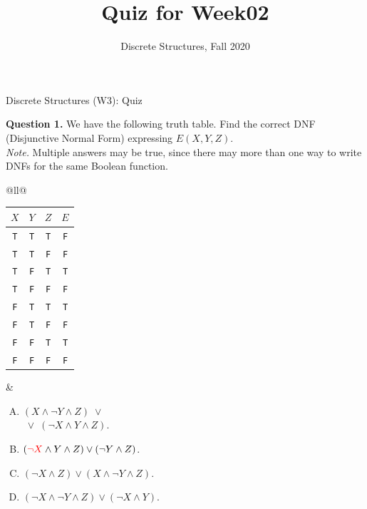 \documentclass[jou]{apa6}
\title{Quiz for Week02}
\author{Discrete Structures, Fall 2020}
\affiliation{RBS}
\begin{document}

\twocolumn
{\Large Discrete Structures (W3): Quiz}

\thispagestyle{empty}

\vspace{6pt}
{\bf Question 1.} We have the following
truth table. 
Find the correct DNF (Disjunctive Normal Form) expressing $E(X,Y,Z)$.\\
{\em Note.} Multiple answers may be true, since
there may more than one way to write DNFs for the same Boolean 
function.


\begin{tabular}{@{}ll@{}} 
\begin{minipage}{0.33\columnwidth}
\noindent
\begin{tabular}{ c | c | c | c }
$X$ & $Y$ & $Z$ & $E$ \\ \hline
{\tt T} & {\tt T} & {\tt T} & {\tt F} \\ \hline
{\tt T} & {\tt T} & {\tt F} & {\tt F} \\ \hline
{\tt T} & {\tt F} & {\tt T} & {\tt T} \\ \hline
{\tt T} & {\tt F} & {\tt F} & {\tt F} \\ \hline
{\tt F} & {\tt T} & {\tt T} & {\tt T} \\ \hline
{\tt F} & {\tt T} & {\tt F} & {\tt F} \\ \hline
{\tt F} & {\tt F} & {\tt T} & {\tt T} \\ \hline
{\tt F} & {\tt F} & {\tt F} & {\tt F} \\ \hline
\end{tabular}
\end{minipage} &
\begin{minipage}{0.65\columnwidth}

\begin{enumerate}[(A)]
\item $(X \wedge \neg Y \wedge Z) \;\vee\;$\\
$\;\vee\; (\neg X \wedge Y \wedge Z)$.
\item $(\textcolor{red}{\neg X} \wedge Y \wedge Z) \vee (\neg Y \wedge Z)$.
\item $(\neg X \wedge Z) \vee (X \wedge \neg Y \wedge Z)$.
\item $(\neg X \wedge \neg Y \wedge Z) \vee (\neg X \wedge Y)$.
\end{enumerate}

\end{minipage}
\end{tabular}
\end{document}
